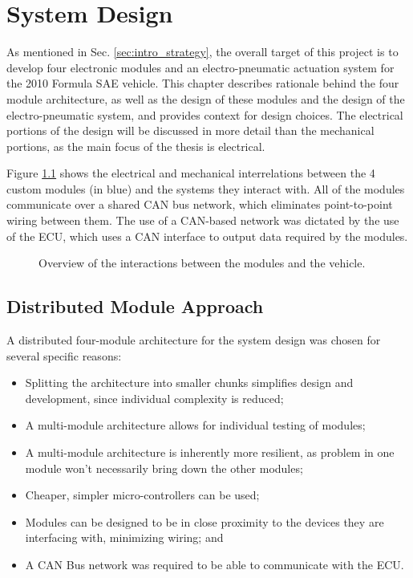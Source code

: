 \chapter{System Design\label{cha:design}}

As mentioned in Sec. \ref{sec:intro_strategy}, the overall target of this project is to develop four electronic modules and an electro-pneumatic actuation system for the 2010 Formula SAE vehicle. This chapter describes rationale behind the four module architecture, as well as the design of these modules and the design of the electro-pneumatic system, and provides context for design choices. The electrical portions of the design will be discussed in more detail than the mechanical portions, as the main focus of the thesis is electrical. 

Figure \ref{fig:design_overview} shows the electrical and mechanical interrelations between the 4 custom modules (in blue) and the systems they interact with. All of the modules communicate over a shared CAN bus network, which eliminates point-to-point wiring between them. The use of a CAN-based network was dictated by the use of the ECU, which uses a CAN interface to output data required by the modules. 

\begin{figure}[H]
\centering

\caption{Overview of the interactions between the modules and the vehicle.}
\label{fig:design_overview}
\end{figure}

\section{Distributed Module Approach}

A distributed four-module architecture for the system design was chosen for several specific reasons:

\begin{itemize}
  \item Splitting the architecture into smaller chunks simplifies design and development, since individual complexity is reduced;
  \item A multi-module architecture allows for individual testing of modules;
  \item A multi-module architecture is inherently more resilient, as problem in one module won't necessarily bring down the other modules;
  \item Cheaper, simpler micro-controllers can be used;
  \item Modules can be designed to be in close proximity to the devices they are interfacing with, minimizing wiring; and
  \item A CAN Bus network was required to be able to communicate with the ECU.
\end{itemize}






